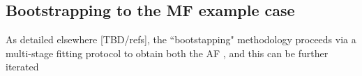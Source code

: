 \subsection{Bootstrapping to the MF example case}

As detailed elsewhere [TBD/refs], the ``bootstapping" methodology proceeds via a multi-stage fitting protocol to obtain both the AF , and this can be further iterated